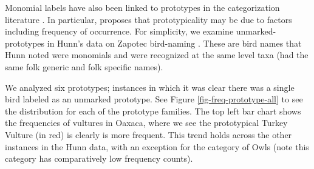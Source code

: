 \documentclass[10pt,letterpaper]{article}
\begin{document}
Monomial labels have also been linked to prototypes in the categorization literature \cite{berlin1972speculations,berlin2014ethnobiological}. In particular,  proposes that prototypicality may be due to factors including frequency of occurrence. For simplicity, we examine unmarked-prototypes in Hunn's data on Zapotec bird-naming  \cite{hunn2008zapotec}. These are bird names that Hunn noted were monomials and were recognized at the same level taxa (had the same folk generic and folk specific names). 

We analyzed six prototypes; instances in which it was clear there was a single bird labeled as an unmarked prototype. See Figure \ref{fig-freq-prototype-all} to see the distribution for each of the prototype families. The top left bar chart shows the frequencies of vultures in Oaxaca, where we see the prototypical Turkey Vulture (in red) is clearly is more frequent. This trend holds across the other instances in the Hunn data, with an exception for the category of Owls (note this category has comparatively low frequency counts).



\end{document}
